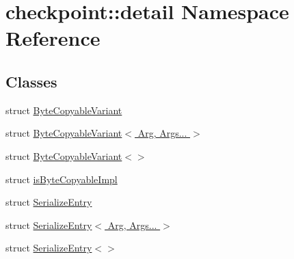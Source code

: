 \hypertarget{namespacecheckpoint_1_1detail}{}\section{checkpoint\+:\+:detail Namespace Reference}
\label{namespacecheckpoint_1_1detail}
\subsection*{Classes}
\begin{DoxyCompactItemize}
\item 
struct \hyperlink{structcheckpoint_1_1detail_1_1_byte_copyable_variant}{Byte\+Copyable\+Variant}
\item 
struct \hyperlink{structcheckpoint_1_1detail_1_1_byte_copyable_variant_3_01_arg_00_01_args_8_8_8_01_4}{Byte\+Copyable\+Variant$<$ Arg, Args... $>$}
\item 
struct \hyperlink{structcheckpoint_1_1detail_1_1_byte_copyable_variant_3_4}{Byte\+Copyable\+Variant$<$$>$}
\item 
struct \hyperlink{structcheckpoint_1_1detail_1_1is_byte_copyable_impl}{is\+Byte\+Copyable\+Impl}
\item 
struct \hyperlink{structcheckpoint_1_1detail_1_1_serialize_entry}{Serialize\+Entry}
\item 
struct \hyperlink{structcheckpoint_1_1detail_1_1_serialize_entry_3_01_arg_00_01_args_8_8_8_01_4}{Serialize\+Entry$<$ Arg, Args... $>$}
\item 
struct \hyperlink{structcheckpoint_1_1detail_1_1_serialize_entry_3_4}{Serialize\+Entry$<$$>$}
\end{DoxyCompactItemize}
